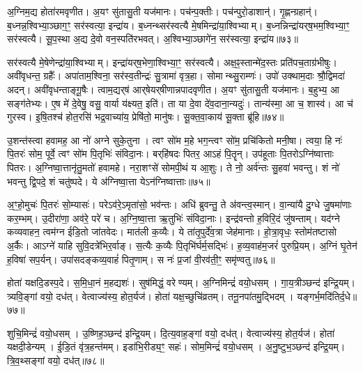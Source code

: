 अ॒ग्निम॒द्य होता॑रमवृणीत।
अ॒यꣳ सु॑तासु॒ती यज॑मानः।
पच॑न्प॒क्तीः।
पच॑न्पुरो॒डाशान्॑।
गृ॒ह्णन्ग्रहान्॑।
ब॒ध्नन्न॒श्विभ्या॒ञ्छाग॒ꣳ॒ सर॑स्वत्या॒ इन्द्रा॑य।
ब॒ध्नन्थ्सर॑स्वत्यै मे॒षमिन्द्रा॑या॒श्विभ्याम्।
ब॒ध्नन्निन्द्रा॑यर्‌\mbox{}ष॒भम॒श्विभ्या॒ꣳ॒ सर॑स्वत्यै।
सू॒प॒स्था अ॒द्य दे॒वो वन॒स्पति॑रभवत्।
अ॒श्विभ्या॒ञ्छागे॑न॒ सर॑स्वत्या॒ इन्द्रा॑य॥७३॥

सर॑स्वत्यै मे॒षेणेन्द्रा॑या॒श्विभ्याम्।
इन्द्रा॑यर्‌\mbox{}ष॒भेणा॒श्विभ्या॒ꣳ॒ सर॑स्वत्यै।
अक्ष॒ꣴ॒स्तान्मे॑द॒स्तः प्रति॑पच॒ताग्र॑भीषुः।
अवी॑वृधन्त॒ ग्रहैः᳚।
अपा॑ताम॒श्विना॒ सर॑स्व॒तीन्द्रः॑ सु॒त्रामा॑ वृत्र॒हा।
सोमान्थ्सु॒राम्णः॑।
उपो॑ उक्थाम॒दाः श्रौ॒द्विमदा॑ अदन्।
अवी॑वृधन्ताङ्गू॒षैः।
त्वाम॒द्यर्‌\mbox{}ष॑ आर्‌\mbox{}षेयर्‌\mbox{}षीणान्नपादवृणीत।
अ॒यꣳ सु॑तासु॒ती यज॑मानः।
ब॒हुभ्य॒ आ सङ्ग॑तेभ्यः।
ए॒ष मे॑ दे॒वेषु॒ वसु॒ वार्या य॑क्ष्यत॒ इति॑।
ता या दे॒वा दे॑व॒दाना॒न्यदुः॑।
तान्य॑स्मा॒ आ च॒ शास्व॑।
आ च॑ गुरस्व।
इ॒षि॒तश्च॑ होत॒रसि॑ भद्र॒वाच्या॑य॒ प्रेषि॑तो॒ मानु॑षः।
सू॒क्त॒वा॒काय॑ सू॒क्ता ब्रू॑हि॥७४॥\anuvakamend[इन्द्रा॑य॒ यज॑मानः स॒प्त च॑]

उ॒शन्त॑स्त्वा हवामह॒ आ नो॑ अग्ने सुके॒तुना।
त्वꣳ सो॑म म॒हे भग॒न्त्वꣳ सो॑म॒ प्रचि॑कितो मनी॒षा।
त्वया॒ हि नः॑ पि॒तरः॑ सोम॒ पूर्वे॒ त्वꣳ सो॑म पि॒तृभिः॑ संविदा॒नः।
बर्‌\mbox{}हि॑षदः पितर॒ आऽहं पि॒तॄन्।
उप॑हूताः पि॒तरो\-ऽग्नि॑ष्वात्ताः पितरः।
अ॒ग्निष्वा॒त्तानृ॑तु॒मतो॑ हवामहे।
नरा॒शꣳसे॑ सोमपी॒थं य आ॒शुः।
ते नो॒ अर्व॑न्तः सु॒हवा॑ भवन्तु।
शं नो॑ भवन्तु द्वि॒पदे॒ शं चतु॑ष्पदे।
ये अ॑ग्निष्वा॒त्ता येऽन॑ग्निष्वात्ताः॥७५॥

अ॒ꣳ॒हो॒मुचः॑ पि॒तरः॑ सो॒म्यासः॑।
परेऽव॑रे॒\-ऽमृता॑सो॒ भव॑न्तः।
अधि॑ ब्रुवन्तु॒ ते अ॑वन्त्व॒स्मान्।
वा॒न्या॑यै दु॒ग्धे जु॒षमा॑णाः कर॒म्भम्।
उ॒दीरा॑णा॒ अव॑रे॒ परे॑ च।
अ॒ग्नि॒ष्वा॒त्ता ऋ॒तुभिः॑ संविदा॒नाः।
इन्द्र॑वन्तो ह॒विरि॒दं जु॑षन्ताम्।
यद॑ग्ने कव्यवाहन॒ त्वम॑ग्न ईडि॒तो जा॑तवेदः।
मात॑ली क॒व्यैः।
ये ता॑तृ॒पुर्दे॑व॒त्रा जेह॑मानाः।
हो॒त्रा॒वृधः॒ स्तोम॑तष्टासो अ॒र्कैः।
आऽग्ने॑ याहि सुवि॒दत्रे॑भिर॒र्वाङ्।
स॒त्यैः क॒व्यैः पि॒तृभि॑र्घर्म॒सद्भिः॑।
ह॒व्य॒वाह॑म॒जरं॑ पुरुप्रि॒यम्।
अ॒ग्निं घृ॒तेन॑ ह॒विषा॑ सप॒र्यन्।
उपा॑सदङ्कव्य॒वाहं॑ पितृ॒णाम्।
स नः॑ प्र॒जां वी॒रव॑ती॒ꣳ॒ समृ॑ण्वतु॥७६॥\anuvakamend[अन॑ग्निष्वात्ता॒ जेह॑मानाः स॒प्त च॑]

होता॑ यक्षदि॒डस्प॒दे।
स॒मि॒धा॒नं म॒हद्यशः॑।
सुष॑मिद्धं॒ वरेण्यम्।
अ॒ग्निमिन्द्रं॑ वयो॒धसम्।
गा॒य॒त्रीञ्छन्द॑ इन्द्रि॒यम्।
त्र्यवि॒ङ्गां वयो॒ दध॑त्।
वेत्वाज्य॑स्य॒ होत॒र्यज॑।
होता॑ यक्ष॒च्छुचि॑व्रतम्।
तनू॒नपा॑तमु॒द्भिदम्।
यङ्गर्भ॒मदि॑तिर्द॒धे॥७७॥

शुचि॒मिन्द्रं॑ वयो॒धसम्।
उ॒ष्णिह॒ञ्छन्द॑ इन्द्रि॒यम्।
दि॒त्य॒वाह॒ङ्गां वयो॒ दध॑त्।
वेत्वाज्य॑स्य॒ होत॒र्यज॑।
होता॑ यक्षदी॒डेन्यम्।
ई॒डि॒तं वृ॑त्र॒हन्त॑मम्।
इडा॑भि॒रीड्य॒ꣳ॒ सहः॑।
सोम॒मिन्द्रं॑ वयो॒धसम्।
अ॒नु॒ष्टुभ॒ञ्छन्द॑ इन्द्रि॒यम्।
त्रि॒व॒थ्सङ्गां वयो॒ दध॑त्॥७८॥

